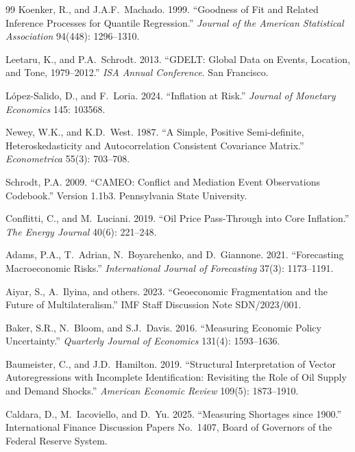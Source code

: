 \documentclass[12pt]{article}
\begin{document}
\begin{thebibliography}{99}
Koenker, R., and J.A.F.~Machado. 1999.
``Goodness of Fit and Related Inference Processes for Quantile Regression.''
\textit{Journal of the American Statistical Association}
94(448): 1296--1310.

Leetaru, K., and P.A.~Schrodt. 2013.
``GDELT: Global Data on Events, Location, and Tone, 1979--2012.''
\textit{ISA Annual Conference}. San Francisco.

L\'{o}pez-Salido, D., and F.~Loria. 2024.
``Inflation at Risk.''
\textit{Journal of Monetary Economics} 145: 103568.

Newey, W.K., and K.D.~West. 1987.
``A Simple, Positive Semi-definite, Heteroskedasticity and
Autocorrelation Consistent Covariance Matrix.''
\textit{Econometrica} 55(3): 703--708.

Schrodt, P.A. 2009.
``CAMEO: Conflict and Mediation Event Observations Codebook.''
Version 1.1b3. Pennsylvania State University.

Conflitti, C., and M.~Luciani. 2019.
``Oil Price Pass-Through into Core Inflation.''
\textit{The Energy Journal} 40(6): 221--248.


Adams, P.A., T.~Adrian, N.~Boyarchenko, and D.~Giannone. 2021.
``Forecasting Macroeconomic Risks.''
\textit{International Journal of Forecasting} 37(3): 1173--1191.

Aiyar, S., A.~Ilyina, and others. 2023.
``Geoeconomic Fragmentation and the Future of Multilateralism.''
IMF Staff Discussion Note SDN/2023/001.

Baker, S.R., N.~Bloom, and S.J.~Davis. 2016.
``Measuring Economic Policy Uncertainty.''
\textit{Quarterly Journal of Economics} 131(4): 1593--1636.

Baumeister, C., and J.D.~Hamilton. 2019.
``Structural Interpretation of Vector Autoregressions with Incomplete
Identification: Revisiting the Role of Oil Supply and Demand Shocks.''
\textit{American Economic Review} 109(5): 1873--1910.

Caldara, D., M.~Iacoviello, and D.~Yu. 2025.
``Measuring Shortages since 1900.''
International Finance Discussion Papers No.~1407,
Board of Governors of the Federal Reserve System.


\end{thebibliography}
\end{document}
